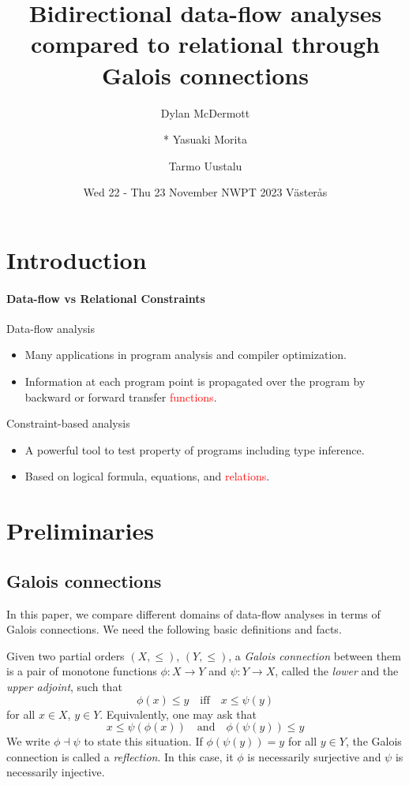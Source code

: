 \documentclass{llncs}
\title{Bidirectional data-flow analyses compared to relational through Galois connections}
\author{
  Dylan McDermott
\and
  * Yasuaki Morita
\and
  Tarmo Uustalu
}
\institute{Reykjavik University}
\date{Wed 22 - Thu 23 November NWPT 2023 V{\"a}ster{\aa}s }
\newcommand{\red}[1]{\textcolor{red}{#1}}
\begin{document}
  
\section{Introduction}

\paragraph{Data-flow vs Relational Constraints}
Data-flow analysis
    \begin{itemize}
    \item Many applications in program analysis and compiler optimization.
    \item Information at each program point is propagated over the program by backward or forward transfer \red{functions}.
    \end{itemize}


Constraint-based analysis
    \begin{itemize}
    \item A powerful tool to test property of programs including type inference.
    \item Based on logical formula, equations, and \red{relations}.
    \end{itemize}


\section{Preliminaries}

\subsection{Galois connections}

In this paper, we compare different domains of data-flow analyses in
terms of Galois connections. We need the following basic definitions
and facts.

Given two partial orders $(X, \leq)$, $(Y, \leq)$, a \emph{Galois
  connection} between them is a pair of monotone functions
$\phi : X \to Y$ and $\psi : Y \to X$, called the \emph{lower} and the
\emph{upper adjoint}, such that
\[
\phi(x) \leq y \quad \mathrm{iff} \quad  x \leq \psi(y)
\]
for all $x \in X$, $y \in Y$. Equivalently, one may ask that
\[
x \leq \psi(\phi(x)) \quad \mathrm{and} \quad \phi(\psi(y)) \leq y 
\]
We write $\phi \dashv \psi$ to state this situation.  If
$\phi(\psi(y)) = y$ for all $y \in Y$, the Galois connection is called
a \emph{reflection}. In this case, it $\phi$ is necessarily surjective
and $\psi$ is necessarily injective.
\end{document}
